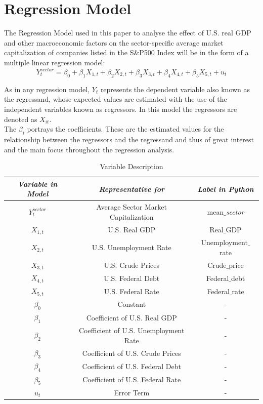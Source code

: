 \documentclass[a4paper,12pt]{article}
\begin{document}
\clearpage
\section{Regression Model}

\noindent The Regression Model used in this paper to analyse the effect of U.S. real GDP and other macroeconomic factors on the sector-specific average market capitalization of companies listed in the S\&P500 Index will be in the form of a multiple linear regression model:
\begin{equation}
  Y_t^{sector}= \beta_0 + \beta_1 X_{1,t} + \beta_2 X_{2,t} + \beta_3 X_{3,t} + \beta_4 X_{4,t} + \beta_5 X_{5,t} + u_t 
\end{equation}

\noindent As in any regression model, $Y_t$ represents the dependent variable also known as the regressand, whose expected values are estimated with the use of the independent variables known as regressors. 
In this model the regressors are denoted as $X_{it}$.\\
The $\beta_i$ portrays the coefficients. These are the estimated values for the relationship between the regressors and the regressand and thus of great interest and the main focus throughout the regression analysis.

\begin{table}[htbp]
\centering 
\setlength\tabcolsep{4pt}
\newcommand\hd[1]{\multicolumn{1}{c}{\textit{#1}}}

\caption{Variable Description}

\begin{tabular}{ c c c } \hline\hline
\hd{Variable in Model} & \hd{Representative for}  & \hd{Label in Python} \\ \hline\hline
$Y_t^{sector}$ & Average Sector Market Capitalization &mean$\_$\textit{sector} \\ \hline
$X_{1,t}$ & U.S. Real GDP &Real$\_$GDP \\ \hline
$X_{2,t}$ &U.S. Unemployment Rate &Unemployment$\_$rate \\ \hline
$X_{3,t}$ &U.S. Crude Prices & Crude$\_$price \\ \hline
$X_{4,t}$ &U.S. Federal Debt & Federal$\_$debt \\ \hline
$X_{5,t}$ &U.S. Federal Rate & Federal$\_$rate \\ \hline
$\beta_0$ &Constant &- \\ \hline
$\beta_1$ &Coefficient of U.S. Real GDP &- \\ \hline
$\beta_2$ &Coefficient of U.S. Unemployment Rate &- \\ \hline
$\beta_3$ &Coefficient of U.S. Crude Prices &- \\ \hline
$\beta_4$ &Coefficient of U.S. Federal Debt &-\\ \hline
$\beta_5$ &Coefficient of U.S. Federal Rate &-\\ \hline
$u_t$  &Error Term &- \\ \hline

\hline
\end{tabular}
\end{table}
\end{document}

